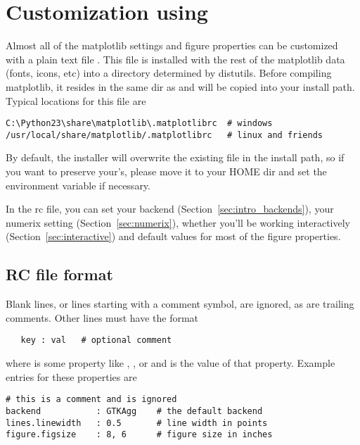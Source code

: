 \documentclass[twoside]{book}
\begin{document}
\section{Customization using }
\label{sec:matplotlibrc}

Almost all of the matplotlib settings and figure properties can be
customized with a plain text file .  This file is
installed with the rest of the matplotlib data (fonts, icons, etc)
into a directory determined by distutils.  Before compiling
matplotlib, it resides in the same dir as  and will be
copied into your install path.  Typical locations for this file are

\begin{verbatim}
C:\Python23\share\matplotlib\.matplotlibrc  # windows
/usr/local/share/matplotlib/.matplotlibrc   # linux and friends  
\end{verbatim}

\noindent By default, the installer will overwrite the existing file in
the install path, so if you want to preserve your's, please move it to
your HOME dir and set the environment variable if necessary.

In the rc file, you can set your backend (Section~\ref{sec:intro_backends}),
your numerix setting (Section~\ref{sec:numerix}), whether you'll be
working interactively (Section~\ref{sec:interactive}) and default
values for most of the figure properties.  


\subsection{RC file format}

Blank lines, or lines starting with a comment symbol, are ignored,
as are trailing comments.  Other lines must have the format

\begin{lstlisting}
   key : val   # optional comment
\end{lstlisting}

\noindent where  is some property like ,
, or  and  is the value
of that property.  Example entries for these properties are

\begin{lstlisting}
# this is a comment and is ignored
backend           : GTKAgg    # the default backend
lines.linewidth   : 0.5       # line width in points
figure.figsize    : 8, 6      # figure size in inches
\end{lstlisting}
\end{document}
